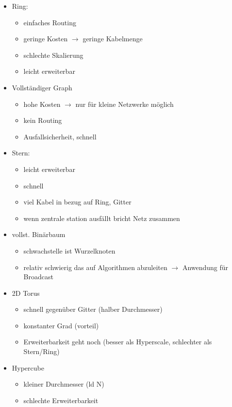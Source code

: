 \begin{itemize}
	\item Ring:
	\begin{itemize}
		\item einfaches Routing
		\item geringe Kosten $\to$ geringe Kabelmenge
		\item schlechte Skalierung
		\item leicht erweiterbar
	\end{itemize}
	\item Vollständiger Graph
	\begin{itemize}
		\item hohe Kosten $\to$ nur für kleine Netzwerke möglich
		\item kein Routing
		\item Ausfallsicherheit, schnell
	\end{itemize}
	\item Stern:
	\begin{itemize}
		\item leicht erweiterbar
		\item schnell
		\item viel Kabel in bezug auf Ring, Gitter
		\item wenn zentrale station ausfällt bricht Netz zusammen
	\end{itemize}
	\item vollst. Binärbaum
	\begin{itemize}
		\item schwachstelle ist Wurzelknoten
		\item relativ schwierig das auf Algorithmen abzuleiten $\to$ Anwendung für Broadcast
	\end{itemize}
	\item 2D Torus
	\begin{itemize}
		\item schnell gegenüber Gitter (halber Durchmesser)
		\item konstanter Grad (vorteil)
		\item Erweiterbarkeit geht noch (besser als Hyperscale, schlechter als Stern/Ring)
	\end{itemize}
	\item Hypercube
	\begin{itemize}
		\item kleiner Durchmesser (ld N)
		\item schlechte Erweiterbarkeit
	\end{itemize}
\end{itemize}
